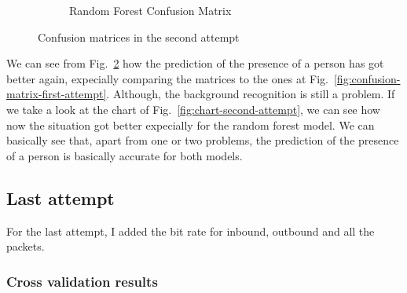 \documentclass[12pt, conference]{IEEEtran}
\begin{document}
\begin{figure}[t]
\begin{subfigure}[b]{.5\linewidth}
        \caption{Random Forest Confusion Matrix}
        \label{fig:confusion-matrix-second-attempt-logreg}
    \end{subfigure}
    \caption{Confusion matrices in the second attempt}
    \label{fig:confusion-matrix-second-attempt}
\end{figure}

We can see from Fig.~\ref{fig:confusion-matrix-second-attempt} how the prediction of the presence of a person has got better again, expecially comparing the matrices to the ones at Fig.~\ref{fig:confusion-matrix-first-attempt}. Although, the background recognition is still a problem. If we take a look at the chart of Fig.~\ref{fig:chart-second-attempt}, we can see how now the situation got better expecially for the random forest model. We can basically see that, apart from one or two problems, the prediction of the presence of a person is basically accurate for both models.

\subsection{Last attempt}
For the last attempt, I added the bit rate for inbound, outbound and all the packets.

\subsubsection{Cross validation results}
\end{document}
